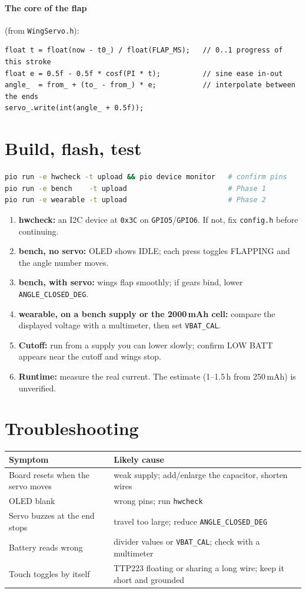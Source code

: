 \documentclass[11pt,a4paper]{article}
\newcommand{\gpio}[1]{\texttt{GPIO#1}}
\begin{document}
\paragraph{The core of the flap} (from \texttt{WingServo.h}):
\begin{lstlisting}
float t = float(now - t0_) / float(FLAP_MS);   // 0..1 progress of this stroke
float e = 0.5f - 0.5f * cosf(PI * t);          // sine ease in-out
angle_  = from_ + (to_ - from_) * e;           // interpolate between the ends
servo_.write(int(angle_ + 0.5f));
\end{lstlisting}

\section{Build, flash, test}
\begin{lstlisting}[language=bash]
pio run -e hwcheck -t upload && pio device monitor   # confirm pins
pio run -e bench    -t upload                        # Phase 1
pio run -e wearable -t upload                        # Phase 2
\end{lstlisting}
\begin{enumerate}
  \item \textbf{hwcheck:} an I2C device at \texttt{0x3C} on \gpio{5}/\gpio{6}. If not, fix \texttt{config.h} before continuing.
  \item \textbf{bench, no servo:} OLED shows IDLE; each press toggles FLAPPING and the angle number moves.
  \item \textbf{bench, with servo:} wings flap smoothly; if gears bind, lower \texttt{ANGLE\_CLOSED\_DEG}.
  \item \textbf{wearable, on a bench supply or the 2000\,mAh cell:} compare the displayed voltage with a multimeter, then set \texttt{VBAT\_CAL}.
  \item \textbf{Cutoff:} run from a supply you can lower slowly; confirm LOW BATT appears near the cutoff and wings stop.
  \item \textbf{Runtime:} measure the real current. The estimate (1--1.5\,h from 250\,mAh) is unverified.
\end{enumerate}

\section{Troubleshooting}
\begin{tabular}{@{}p{4.8cm}p{9.5cm}@{}}
\toprule
Symptom & Likely cause \\ \midrule
Board resets when the servo moves & weak supply; add/enlarge the capacitor, shorten wires \\
OLED blank & wrong pins; run \texttt{hwcheck} \\
Servo buzzes at the end stops & travel too large; reduce \texttt{ANGLE\_CLOSED\_DEG} \\
Battery reads wrong & divider values or \texttt{VBAT\_CAL}; check with a multimeter \\
Touch toggles by itself & TTP223 floating or sharing a long wire; keep it short and grounded \\
\bottomrule
\end{tabular}
\end{document}
